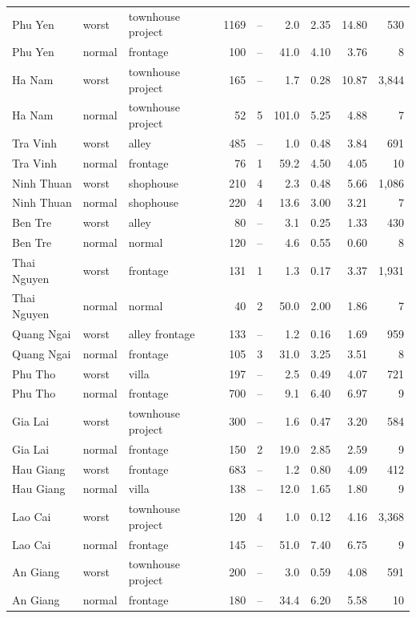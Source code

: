 {\begin{longtable}{lllrrrrrr}
Phu Yen & worst & townhouse project & 1169 & -- & 2.0 & 2.35 & 14.80 & 530 \\
Phu Yen & normal & frontage & 100 & -- & 41.0 & 4.10 & 3.76 & 8 \\
Ha Nam & worst & townhouse project & 165 & -- & 1.7 & 0.28 & 10.87 & 3,844 \\
Ha Nam & normal & townhouse project & 52 & 5 & 101.0 & 5.25 & 4.88 & 7 \\
Tra Vinh & worst & alley & 485 & -- & 1.0 & 0.48 & 3.84 & 691 \\
Tra Vinh & normal & frontage & 76 & 1 & 59.2 & 4.50 & 4.05 & 10 \\
Ninh Thuan & worst & shophouse & 210 & 4 & 2.3 & 0.48 & 5.66 & 1,086 \\
Ninh Thuan & normal & shophouse & 220 & 4 & 13.6 & 3.00 & 3.21 & 7 \\
Ben Tre & worst & alley & 80 & -- & 3.1 & 0.25 & 1.33 & 430 \\
Ben Tre & normal & normal & 120 & -- & 4.6 & 0.55 & 0.60 & 8 \\
Thai Nguyen & worst & frontage & 131 & 1 & 1.3 & 0.17 & 3.37 & 1,931 \\
Thai Nguyen & normal & normal & 40 & 2 & 50.0 & 2.00 & 1.86 & 7 \\
Quang Ngai & worst & alley frontage & 133 & -- & 1.2 & 0.16 & 1.69 & 959 \\
Quang Ngai & normal & frontage & 105 & 3 & 31.0 & 3.25 & 3.51 & 8 \\
Phu Tho & worst & villa & 197 & -- & 2.5 & 0.49 & 4.07 & 721 \\
Phu Tho & normal & frontage & 700 & -- & 9.1 & 6.40 & 6.97 & 9 \\
Gia Lai & worst & townhouse project & 300 & -- & 1.6 & 0.47 & 3.20 & 584 \\
Gia Lai & normal & frontage & 150 & 2 & 19.0 & 2.85 & 2.59 & 9 \\
Hau Giang & worst & frontage & 683 & -- & 1.2 & 0.80 & 4.09 & 412 \\
Hau Giang & normal & villa & 138 & -- & 12.0 & 1.65 & 1.80 & 9 \\
Lao Cai & worst & townhouse project & 120 & 4 & 1.0 & 0.12 & 4.16 & 3,368 \\
Lao Cai & normal & frontage & 145 & -- & 51.0 & 7.40 & 6.75 & 9 \\
An Giang & worst & townhouse project & 200 & -- & 3.0 & 0.59 & 4.08 & 591 \\
An Giang & normal & frontage & 180 & -- & 34.4 & 6.20 & 5.58 & 10 \\

\end{longtable}}
